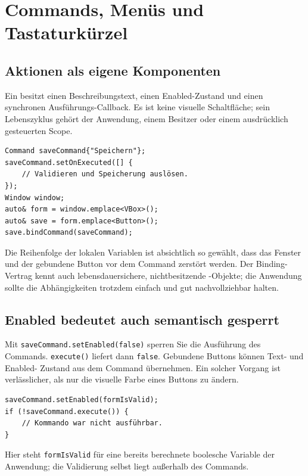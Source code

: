 \chapter{Commands, Menüs und Tastaturkürzel}\label{chap:commands}

\section{Aktionen als eigene Komponenten}
Ein  besitzt einen Beschreibungstext,
einen Enabled-Zustand und einen synchronen
Ausführungs-Callback. Es ist keine visuelle
Schaltfläche; sein Lebenszyklus gehört der
Anwendung, einem Besitzer oder einem
ausdrücklich gesteuerten Scope.

\begin{lstlisting}[language=SASDCpp,caption={Eine Aktion, mehrere Auslöser}]
Command saveCommand{"Speichern"};
saveCommand.setOnExecuted([] {
    // Validieren und Speicherung auslösen.
});
Window window;
auto& form = window.emplace<VBox>();
auto& save = form.emplace<Button>();
save.bindCommand(saveCommand);
\end{lstlisting}
Die Reihenfolge der lokalen Variablen ist
absichtlich so gewählt, dass das Fenster und
der gebundene Button vor dem Command
zerstört werden. Der Binding-Vertrag kennt
auch lebensdauersichere, nichtbesitzende
-Objekte; die
Anwendung sollte die Abhängigkeiten
trotzdem einfach und gut nachvollziehbar halten.

\section{Enabled bedeutet auch semantisch gesperrt}
Mit \texttt{saveCommand.setEnabled(false)}
sperren Sie die Ausführung des Commands.
\texttt{execute()} liefert dann \texttt{false}.
Gebundene Buttons können Text- und Enabled-
Zustand aus dem Command übernehmen.
Ein solcher Vorgang ist verlässlicher, als nur
die visuelle Farbe eines Buttons zu ändern.

\begin{lstlisting}[language=SASDCpp]
saveCommand.setEnabled(formIsValid);
if (!saveCommand.execute()) {
    // Kommando war nicht ausführbar.
}
\end{lstlisting}
Hier steht \texttt{formIsValid} für eine
bereits berechnete boolesche Variable der
Anwendung; die Validierung selbst liegt
außerhalb des Commands.

